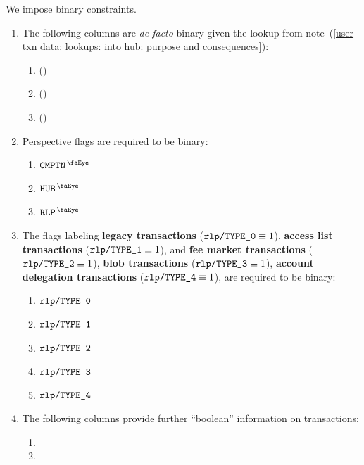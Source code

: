 We impose binary constraints.
\begin{enumerate}
	\item
		The following columns are \emph{de facto} binary given the lookup from
		note~(\ref{user txn data: lookups: into hub: purpose and consequences}):
		\begin{enumerate}
			\item \sysi{} \quad (\sanityCheck)
			\item \user{} \quad (\sanityCheck)
			\item \sysf{} \quad (\sanityCheck)
		\end{enumerate}
	\item
		Perspective flags are required to be binary:
		\begin{enumerate}
			\item $\isUserTxnComputation$
			\item $\isUserTxnHubView$
			\item $\isUserTxnRlpView$
		\end{enumerate}
	\item
		The flags labeling
		\textbf{legacy transactions}             ($\texttt{rlp}\texttt{/}{\texttt{\texttt{TYPE\_0}}}            \equiv 1$),
		\textbf{access list transactions}        ($\texttt{rlp}\texttt{/}{\texttt{\texttt{TYPE\_1}}}         \equiv 1$), and
		\textbf{fee market transactions}         ($\texttt{rlp}\texttt{/}{\texttt{\texttt{TYPE\_2}}}           \equiv 1$),
		\textbf{blob transactions}               ($\texttt{rlp}\texttt{/}{\texttt{\texttt{TYPE\_3}}}              \equiv 1$),
		\textbf{account delegation transactions} ($\texttt{rlp}\texttt{/}{\texttt{\texttt{TYPE\_4}}} \equiv 1$),
		are required to be binary:
		\begin{enumerate}
			\item $\texttt{rlp}\texttt{/}{\texttt{\texttt{TYPE\_0}}}            $
			\item $\texttt{rlp}\texttt{/}{\texttt{\texttt{TYPE\_1}}}         $
			\item $\texttt{rlp}\texttt{/}{\texttt{\texttt{TYPE\_2}}}           $
			\item $\texttt{rlp}\texttt{/}{\texttt{\texttt{TYPE\_3}}}              $
			\item $\texttt{rlp}\texttt{/}{\texttt{\texttt{TYPE\_4}}} $
		\end{enumerate}
	\item
		The following columns provide further ``boolean'' information on transactions:
		\begin{enumerate}
			\item \txnDataHubIsDeployment                                           {}
			\item \txnDataHubTransactionTypeSupportsEipFifteenFiftyNineGasSemantics {}

\end{enumerate}
\end{enumerate}
